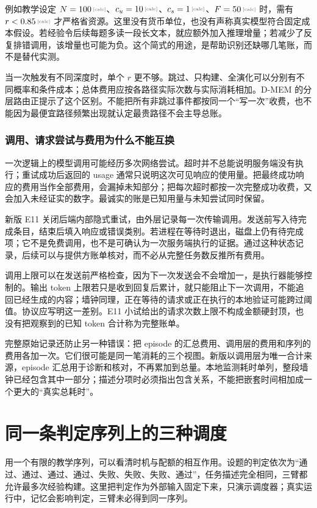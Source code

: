 例如教学设定 $N=\calcnum{100}$、$c_u=\calcnum{10}$、$c_s=\calcnum{1}$、$F=\calcnum{50}$ 时，需有 $r<\calcnum{0.85}$ 才严格省资源。这里没有货币单位，也没有声称真实模型符合固定成本假设。若经验令后续每题多读一段长文本，就应额外加入推理增量；若减少了反复排错调用，该增量也可能为负。这个简式的用途，是帮助识别还缺哪几笔账，而不是替代实测。

当一次触发有不同深度时，单个 $r$ 更不够。跳过、只构建、全演化可以分别有不同概率和条件成本；总体费用应按各路径实际次数与实际消耗相加。D-MEM 的分层路由正提示了这个区别\cite{dmem-2603}。不能把所有非跳过事件都按同一个“写一次”收费，也不能因为最便宜路径频繁出现就认定最贵路径不会主导总账。

\subsubsection{调用、请求尝试与费用为什么不能互换}

一次逻辑上的模型调用可能经历多次网络尝试。超时并不总能说明服务端没有执行；重试成功后返回的 usage 通常只说明这次可见响应的使用量。把最终成功响应的费用当作全部费用，会漏掉未知部分；把每次超时都按一次完整成功收费，又会加入未经证实的数字。最诚实的账是已知用量与未知尝试同时保留。

新版 E11 关闭后端内部隐式重试，由外层记录每一次传输调用。发送前写入待完成条目，结束后填入响应或错误类别。若进程在等待时退出，磁盘上仍有待完成项；它不是免费调用，也不是可确认为一次服务端执行的证据。通过这种状态记录，后续可以与提供方账单核对，而不必从完整任务数反推所有费用。

调用上限可以在发送前严格检查，因为下一次发送会不会增加一，是执行器能够控制的。输出 token 上限若只是收到回复后累计，就只能阻止下一次调用，不能追回已经生成的内容；墙钟同理，正在等待的请求或正在执行的本地验证可能跨过阈值。协议应写明这一差别。E11 小试给出的请求次数上限不构成金额硬封顶，也没有把观察到的已知 token 合计称为完整账单。

完整原始记录还防止另一种错误：把 episode 的汇总费用、调用层的费用和序列的费用各加一次。它们很可能是同一笔消耗的三个视图。新版以调用层为唯一合计来源，episode 汇总用于诊断和核对，不再累加到总量。本地监测耗时单列，整段墙钟已经包含其中一部分；描述分项时必须指出包含关系，不能把嵌套时间相加成一个更大的“真实总耗时”。

\section{同一条判定序列上的三种调度}
\label{sec:ch13-trace-example}

用一个有限的教学序列，可以看清时机与配额的相互作用。设题的判定依次为“通过、通过、通过、通过、失败、失败、失败、通过”，任务描述完全相同，三臂都允许最多次经验构建。这里把判定作为外部输入固定下来，只演示调度器；真实运行中，记忆会影响判定，三臂未必得到同一序列。

